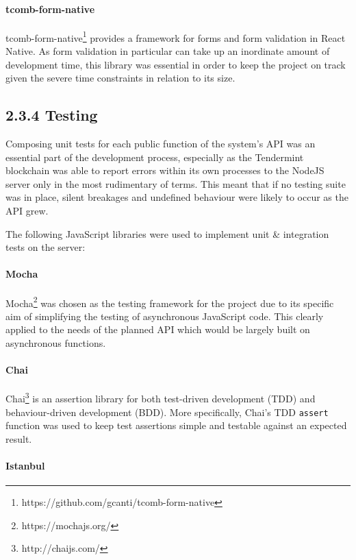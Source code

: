 \paragraph{tcomb-form-native}\label{tcomb-form-native}

tcomb-form-native\footnote{https://github.com/gcanti/tcomb-form-native}
provides a framework for forms and form validation in React Native. As
form validation in particular can take up an inordinate amount of
development time, this library was essential in order to keep the
project on track given the severe time constraints in relation to its
size.

\subsection{2.3.4 Testing}\label{testing}

Composing unit tests for each public function of the system's API was an
essential part of the development process, especially as the Tendermint
blockchain was able to report errors within its own processes to the
NodeJS server only in the most rudimentary of terms. This meant that if
no testing suite was in place, silent breakages and undefined behaviour
were likely to occur as the API grew.

The following JavaScript libraries were used to implement unit \&
integration tests on the server:

\paragraph{Mocha}\label{mocha}

Mocha\footnote{https://mochajs.org/} was chosen as the testing
framework for the project due to its specific aim of simplifying the
testing of asynchronous JavaScript code. This clearly applied to the
needs of the planned API which would be largely built on asynchronous
functions.

\paragraph{Chai}\label{chai}

Chai\footnote{http://chaijs.com/} is an assertion library for both
test-driven development (TDD) and behaviour-driven development (BDD).
More specifically, Chai's TDD \texttt{assert} function was used to keep
test assertions simple and testable against an expected result.

\paragraph{Istanbul}\label{istanbul}

